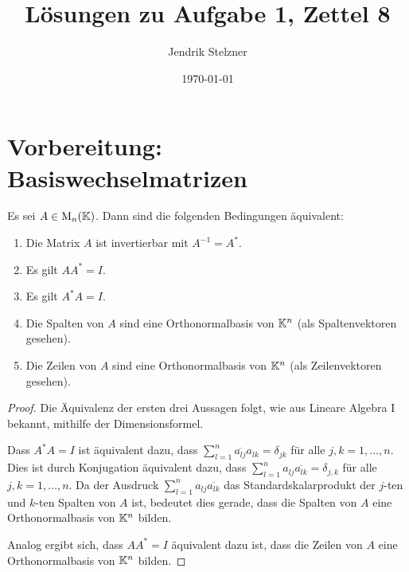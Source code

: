 \documentclass[a4paper, 10pt, numbers=noenddot]{scrartcl}
\title{Lösungen zu Aufgabe 1, Zettel 8}
\author{Jendrik Stelzner}
\date{\today}
\begin{document}
\maketitle



\section{Vorbereitung: Basiswechselmatrizen}


\begin{lemma}
  Es sei $A \in \operatorname{M}_n(\mathbb{K})$.
  Dann sind die folgenden Bedingungen äquivalent:
  \begin{enumerate}
    \item
      Die Matrix $A$ ist invertierbar mit $A^{-1} = A^*$.
    \item
      Es gilt $A A^* = I$.
    \item
      Es gilt $A^* A = I$.
    \item
      Die Spalten von $A$ sind eine Orthonormalbasis von $\mathbb{K}^n$ (als Spaltenvektoren gesehen).
    \item
      Die Zeilen von $A$ sind eine Orthonormalbasis von $\mathbb{K}^n$ (als Zeilenvektoren gesehen).
  \end{enumerate}
\end{lemma}
\begin{proof}
  Die Äquivalenz der ersten drei Aussagen folgt, wie aus Lineare Algebra I bekannt, mithilfe der Dimensionsformel.
  
  Dass $A^* A = I$ ist äquivalent dazu, dass $\sum_{l=1}^n \overline{a_{lj}} a_{lk} = \delta_{jk}$ für alle $j,k = 1, \dotsc, n$.
  Dies ist durch Konjugation äquivalent dazu, dass $\sum_{l=1}^n a_{lj} \overline{a_{lk}} = \delta_{j,k}$ für alle $j, k = 1, \dotsc, n$.
  Da der Ausdruck $\sum_{l=1}^n a_{lj} \overline{a_{lk}}$ das Standardskalarprodukt der $j$-ten und $k$-ten Spalten von $A$ ist, bedeutet dies gerade, dass die Spalten von $A$ eine Orthonormalbasis von $\mathbb{K}^n$ bilden.
  
  Analog ergibt sich, dass $A A^* = I$ äquivalent dazu ist, dass die Zeilen von $A$ eine Orthonormalbasis von $\mathbb{K}^n$ bilden.
\end{proof}
\end{document}
